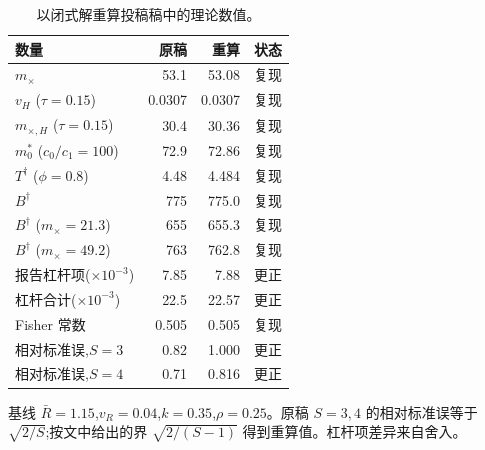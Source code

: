 \begin{table}[htbp]
\centering
\footnotesize
\caption{以闭式解重算投稿稿中的理论数值。}
\label{tab:s7}
\begin{tabular}{lrrl}
\toprule
数量 & 原稿 & 重算 & 状态 \\
\midrule
$m_\times$ & 53.1 & 53.08 & 复现 \\
$v_H$ ($\tau=0.15$) & 0.0307 & 0.0307 & 复现 \\
$m_{\times,H}$ ($\tau=0.15$) & 30.4 & 30.36 & 复现 \\
$m_0^*$ ($c_0/c_1=100$) & 72.9 & 72.86 & 复现 \\
$T^\dagger$ ($\phi=0.8$) & 4.48 & 4.484 & 复现 \\
$B^\dagger$ & 775 & 775.0 & 复现 \\
$B^\dagger$ ($m_\times=21.3$) & 655 & 655.3 & 复现 \\
$B^\dagger$ ($m_\times=49.2$) & 763 & 762.8 & 复现 \\
报告杠杆项($\times10^{-3}$) & 7.85 & 7.88 & 更正 \\
杠杆合计($\times10^{-3}$) & 22.5 & 22.57 & 更正 \\
Fisher 常数 & 0.505 & 0.505 & 复现 \\
相对标准误,$S=3$ & 0.82 & 1.000 & 更正 \\
相对标准误,$S=4$ & 0.71 & 0.816 & 更正 \\
\bottomrule
\end{tabular}
\par\smallskip
\begin{minipage}{0.95\linewidth}\scriptsize 基线 $\bar{R}=1.15$,$v_R=0.04$,$k=0.35$,$\rho=0.25$。原稿 $S=3,4$ 的相对标准误等于 $\sqrt{2/S}$;按文中给出的界 $\sqrt{2/(S-1)}$ 得到重算值。杠杆项差异来自舍入。\end{minipage}
\end{table}
